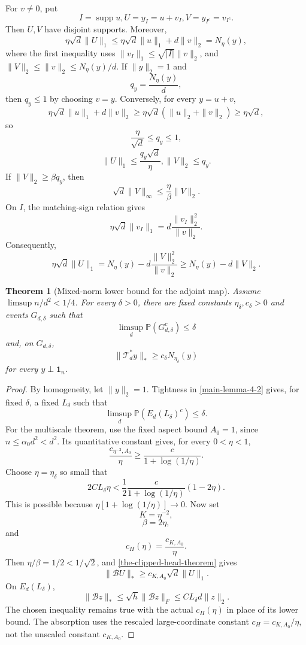 \documentclass[11pt]{article}
\numberwithin{equation}{section}
\newtheorem{theorem}{Theorem}[section]
\theoremstyle{definition}
\theoremstyle{remark}
\newcommand{\Pp}{\mathbb P}
\newcommand{\1}{\boldsymbol 1}
\begin{document}
\begin{aiblock}
For $v\ne0$, put
\[
  I=\operatorname{supp}u, U=y_I=u+v_I, V=y_{I^c}=v_{I^c}.
\]
Then $U,V$ have disjoint supports. Moreover,
\[
  \eta\sqrt d\|U\|_1\le\eta\sqrt d\|u\|_1+d\|v\|_2=
  N_\eta(y),
\]
where the first inequality uses
$\|v_I\|_1\le\sqrt{|I|}\|v\|_2$, and $\|V\|_2\le\|v\|_2\le
N_\eta(y)/d$. If $\|y\|_2=1$ and
\[
  q_y=\frac{N_\eta(y)}d,
\]
then $q_y\le1$ by choosing $v=y$. Conversely, for every
$y=u+v$,
\[
  \eta\sqrt d\|u\|_1+d\|v\|_2\ge\eta\sqrt d(\|u\|_2+
  \|v\|_2)\ge\eta\sqrt d,
\]
so
\[
  \frac\eta{\sqrt d}\le q_y\le1,
\]
\[
  \|U\|_1\le\frac{q_y\sqrt d}{\eta}, \|V\|_2\le q_y.
\]
If $\|V\|_2\ge\beta q_y$, then
\[
  \sqrt d\|V\|_\infty\le\frac\eta\beta\|V\|_2.
\]
On $I$, the matching-sign relation gives
\[
  \eta\sqrt d\|v_I\|_1=d\frac{\|v_I\|_2^2}{\|v\|_2}.
\]
Consequently,
\[
  \eta\sqrt d\|U\|_1 =N_\eta(y)-d\frac{\|V\|_2^2}
  {\|v\|_2} \ge N_\eta(y)-d\|V\|_2.
\]

\begin{theorem}[Mixed-norm lower bound for the adjoint
  map]\label{main-theorem-7-1}
  Assume $\limsup n/d^2<1/4$. For every $\delta>0$, there
  are fixed constants $\eta_\delta,c_\delta>0$ and events
  $G_{d,\delta}$ such that
  \[
    \limsup_d\Pp(G_{d,\delta}^c)\le\delta
  \]
  and, on $G_{d,\delta}$,
  \[
    \|\mathcal{T}_d^*y\|_*\ge c_\delta N_{\eta_\delta}(y)
  \]
  for every $y\perp\1_n$.
\end{theorem}

\begin{proof}
  By homogeneity, let $\|y\|_2=1$. Tightness in
  \cref{main-lemma-4-2} gives, for fixed $\delta$, a fixed
  $L_\delta$ such that
  \[
    \limsup_d\Pp(E_d(L_\delta)^c)\le\delta.
  \]
  For the multiscale theorem, use the fixed aspect bound
  $A_0=1$, since $n\le\alpha_0d^2<d^2$. Its quantitative
  constant gives, for every $0<\eta<1$,
  \[
    \frac{c_{\eta^{-2},A_0}}{\eta} \ge\frac{c}{1+\log
    (1/\eta)}.
  \]
  Choose $\eta=\eta_\delta$ so small that
  \[
    2CL_\delta\eta <\frac12\frac{c}{1+\log(1/\eta)}
    (1-2\eta).
  \]
  This is possible because $\eta[1+\log(1/\eta)]\to0$.
  Now set
  \[
    K=\eta^{-2},
  \]
  \[
    \beta=2\eta,
  \]
  and
  \[
    c_H(\eta)=\frac{c_{K,A_0}}{\eta}.
  \]
  Then $\eta/\beta=1/2<1/\sqrt2$, and
  \cref{the-clipped-head-theorem} gives
  \[
    \|\mathcal{B}U\|_* \ge c_{K,A_0}\sqrt d\|U\|_1.
  \]
  On $E_d(L_\delta)$,
  \[
    \|\mathcal{B}z\|_* \le\sqrt h\|\mathcal{B}z\|_F \le
    C L_\delta d\|z\|_2.
  \]
  The chosen inequality remains true with the actual
  $c_H(\eta)$ in place of its lower bound. The absorption
  uses the rescaled large-coordinate constant
  $c_H=c_{K,A_0}/\eta$, not the unscaled constant
  $c_{K,A_0}$.


\end{proof}
\end{aiblock}
\end{document}
